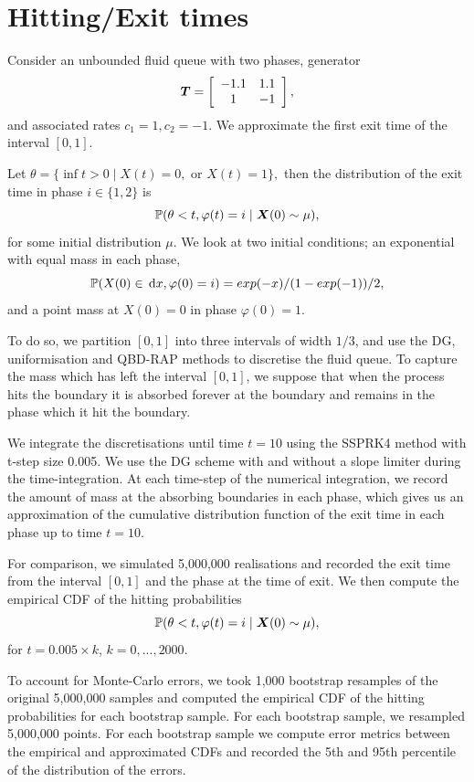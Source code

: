 \section{Hitting/Exit times}
\begin{model}\label{model: simple2}
Consider an unbounded fluid queue with two phases, generator 
\[\boldsymbol T = \left[\begin{array}{cc}
	-1.1 & 1.1 \\
	1 & -1
\end{array}\right],\]
and associated rates \(c_1=1, c_2=-1\). We approximate the first exit time of the interval \([0,1]\). 
\end{model}
Let \(\theta = \{\inf t>0 \mid X(t)=0, \mbox{ or }X(t)=1\},\) then the distribution of the exit time in phase \(i\in\{1,2\}\) is 
\begin{equation}\label{eqn: hit cdf}\mathbb P(\theta < t, \varphi(t)=i\mid \boldsymbol X(0)\sim \mu),\end{equation}
for some initial distribution \(\mu\). We look at two initial conditions; an exponential with equal mass in each phase, 
\[\mathbb P(X(0)\in\, \mathrm{d} x,\varphi(0)=i) = exp(-x)/(1-exp(-1))/2,\]
and a point mass at \(X(0)=0\) in phase \(\varphi(0)=1\). 

To do so, we partition \([0,1]\) into three intervals of width \(1/3\), and use the DG, uniformisation and QBD-RAP methods to discretise the fluid queue. To capture the mass which has left the interval \([0,1]\), we suppose that when the process hits the boundary it is absorbed forever at the boundary and remains in the phase which it hit the boundary. 

We integrate the discretisations until time \(t=10\) using the SSPRK4 method with t-step size 0.005. We use the DG scheme with and without a slope limiter during the time-integration. At each time-step of the numerical integration, we record the amount of mass at the absorbing boundaries in each phase, which gives us an approximation of the cumulative distribution function of the exit time in each phase up to time \(t=10\). 

For comparison, we simulated 5,000,000 realisations and recorded the exit time from the interval \([0,1]\) and the phase at the time of exit. We then compute the empirical CDF of the hitting probabilities 
\[\mathbb P(\theta < t, \varphi(t)=i\mid \boldsymbol X(0)\sim \mu),\] 
for \(t=0.005\times k\), \(k=0,...,2000\). 

To account for Monte-Carlo errors, we took 1,000 bootstrap resamples of the original 5,000,000 samples and computed the empirical CDF of the hitting probabilities for each bootstrap sample. For each bootstrap sample, we resampled 5,000,000 points. For each bootstrap sample we compute error metrics between the empirical and approximated CDFs and recorded the 5th and 95th percentile of the distribution of the errors. 


